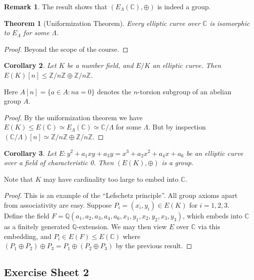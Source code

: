 \documentclass[a4paper]{article}
\newtheorem{theorem}{Theorem}
\newtheorem{corollary}[theorem]{Corollary}
\theoremstyle{definition}
\newtheorem*{remark}{Remark}
\newcommand{\Z}{\mathbb{Z}}
\newcommand{\Q}{\mathbb{Q}}
\newcommand{\C}{\mathbb{C}}
\begin{document}
\begin{remark}
    The result shows that $(E_\Lambda(\C),\oplus)$ is indeed a group.
\end{remark}

\begin{theorem}[Uniformization Theorem]
    Every elliptic curve over $\C$ is isomorphic to $E_\Lambda$ for some
    $\Lambda$.
\end{theorem}

\begin{proof}
    Beyond the scope of the course.
\end{proof}

\begin{corollary}
    Let $K$ be a number field, and $E/K$ an elliptic curve. Then
    $E(K)[n]\le\Z/n\Z\oplus\Z/n\Z$.
\end{corollary}
Here $A[n]=\{a\in A:na=0\}$ denotes the $n$-torsion subgroup of an abelian group
$A$.

\begin{proof}
    By the uniformization theorem we have
    $E(K)\le E(\C)\simeq E_\Lambda(\C)\simeq\C/\Lambda$ for some $\Lambda$. But
    by inspection $(\C/\Lambda)[n]\simeq\Z/n\Z\oplus\Z/n\Z$.
\end{proof}

\begin{corollary}
    Let $E:y^2+a_1xy+a_3y=x^3+a_2x^2+a_4x+a_6$ be an elliptic curve over a field
    of characteristic 0. Then $(E(K),\oplus)$ is a group.
\end{corollary}

Note that $K$ may have cardinality too large to embed into $\C$.

\begin{proof}
    This is an example of the ``Lefschetz principle''. All group axioms apart
    from associativity are easy. Suppose $P_i=(x_i,y_i)\in E(K)$ for $i=1,2,3$.
    Define the field $F=\Q(a_1,a_2,a_3,a_4,a_6,x_1,y_1,x_2,y_2,x_3,y_3)$, which
    embeds into $\C$ as a finitely generated $\Q$-extension. We may then view
    $E$ over $\C$ via this embedding, and $P_i\in E(F)\le E(\C)$ where
    $(P_1\oplus P_2)\oplus P_3=P_1\oplus(P_2\oplus P_3)$ by the previous result.
\end{proof}

\subsection*{Exercise Sheet 2}
\end{document}
